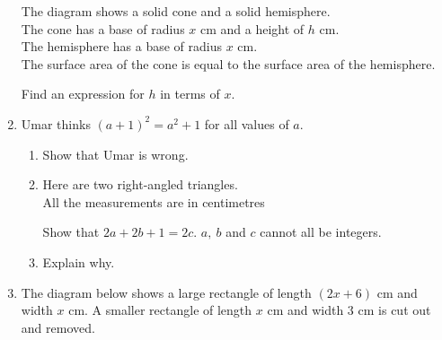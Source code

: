\begin{enumerate}
\begin{figure}[H]
  \end{figure}
  The diagram shows a solid cone and a solid hemisphere.\\
  The cone has a base of radius $x$ cm and a height of $h$ cm.\\
  The hemisphere has a base of radius $x$ cm.\\
  The surface area of the cone is equal to the surface area of the hemisphere.\par
  Find an expression for $h$ in terms of $x$.\strch
  \item Umar thinks $(a + 1)^2 = a^2 + 1$ for all values of $a$.
  \begin{enumerate}
    \item Show that Umar is wrong.\strch
    \item Here are two right-angled triangles.\\
    All the measurements are in centimetres
    \begin{figure}[H]
      \centering
    \end{figure}
    Show that $2a + 2b + 1 = 2c$. $a,\ b$ and $c$ cannot all be integers.\strch
    \newpage
    \item Explain why.\strch
  \end{enumerate}
  \item The diagram below shows a large rectangle of length $(2x + 6)$ cm and width $x$ cm. A smaller rectangle of length $x$ cm and width $3$ cm is cut out and removed.
  \begin{figure}[H]
    \centering
\end{figure}
\end{enumerate}
